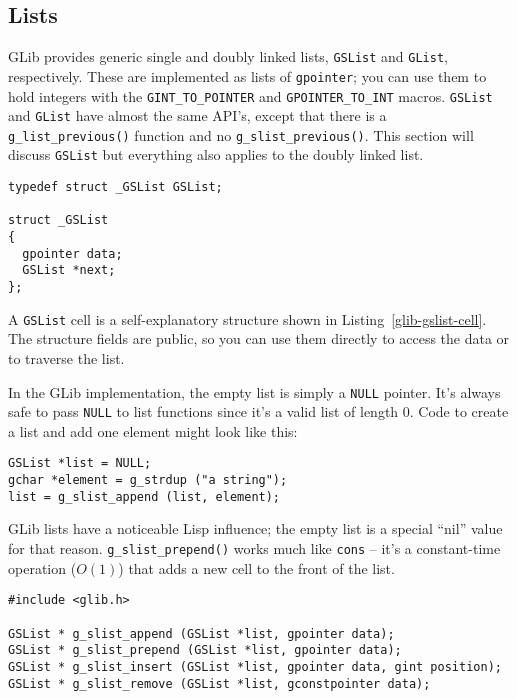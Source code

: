 \subsection{Lists}

GLib provides generic single and doubly linked lists, \lstinline{GSList} and \lstinline{GList}, respectively. These are implemented as lists of \lstinline{gpointer}; you can use them to hold integers with the \lstinline{GINT_TO_POINTER} and \lstinline{GPOINTER_TO_INT} macros. \lstinline{GSList} and \lstinline{GList} have almost the same API's, except that there is a \lstinline{g_list_previous()} function and no \lstinline{g_slist_previous()}. This section will discuss \lstinline{GSList} but everything also applies to the doubly linked list.

\begin{lstlisting}[float, caption={GSList cell}, label=glib-gslist-cell]
typedef struct _GSList GSList;

struct _GSList
{
  gpointer data;
  GSList *next;
};
\end{lstlisting}

A \lstinline{GSList} cell is a self-explanatory structure shown in Listing~\ref{glib-gslist-cell}. The structure fields are public, so you can use them directly to access the data or to traverse the list.

In the GLib implementation, the empty list is simply a \lstinline{NULL} pointer. It's always safe to pass \lstinline{NULL} to list functions since it's a valid list of length 0. Code to create a list and add one element might look like this:
\begin{lstlisting}
GSList *list = NULL;
gchar *element = g_strdup ("a string");
list = g_slist_append (list, element);
\end{lstlisting}

GLib lists have a noticeable Lisp influence; the empty list is a special ``nil'' value for that reason. \lstinline{g_slist_prepend()} works much like \texttt{cons} -- it's a constant-time operation ($O(1)$) that adds a new cell to the front of the list.

\begin{lstlisting}[float, caption={Changing linked list contents}, label=glib-listchanging]
#include <glib.h>

GSList * g_slist_append (GSList *list, gpointer data);
GSList * g_slist_prepend (GSList *list, gpointer data);
GSList * g_slist_insert (GSList *list, gpointer data, gint position);
GSList * g_slist_remove (GSList *list, gconstpointer data);
\end{lstlisting}

